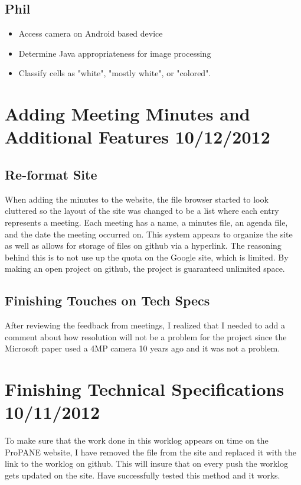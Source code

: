 \documentclass[]{article}
\begin{document}
		\subsection{Phil}
			\begin{itemize}
				\item Access camera on Android based device
				\item Determine Java appropriateness for image processing
				\item Classify cells as "white", "mostly white", or "colored".
			\end{itemize}
	
	
	\section{Adding Meeting Minutes and Additional Features 10/12/2012}
		
		\subsection{Re-format Site}
			When adding the minutes to the website, the file browser started to look cluttered so the layout of the site was changed to be a list where each entry represents a meeting. Each meeting has a name, a minutes file, an agenda file, and the date the meeting occurred on. This system appears to organize the site as well as allows for storage of files on github via a hyperlink. The reasoning behind this is to not use up the quota on the Google site, which is limited. By making an open project on github, the project is guaranteed unlimited space. 
			
		\subsection{Finishing Touches on Tech Specs}
			After reviewing the feedback from meetings, I realized that I needed to add a comment about how resolution will not be a problem for the project since the Microsoft paper used a 4MP camera 10 years ago and it was not a problem.
		
	\section{Finishing Technical Specifications 10/11/2012}
		To make sure that the work done in this worklog appears on time on the ProPANE website, I have removed the file from the site and replaced it with the link to the worklog on github. This will insure that on every push the worklog gets updated on the site. Have successfully tested this method and it works.\\
		
\end{document}
